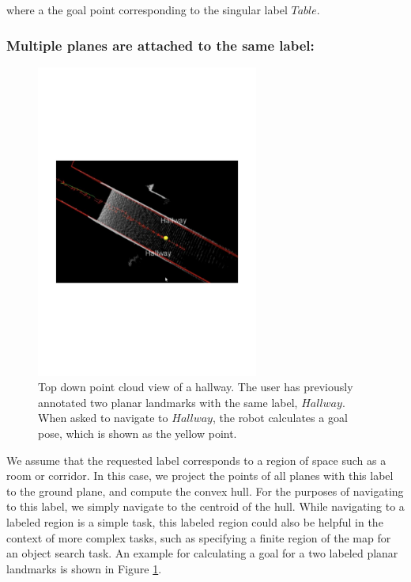 where a the goal point corresponding to the singular label $Table$. 

\subsubsection{Multiple planes are attached to the same label: }

\begin{figure}[ht!]
\centering
\includegraphics[width=0.65\textwidth]{pics/double_plane}
\caption{Top down point cloud view of a hallway. The user has previously annotated two planar landmarks with the same label, $Hallway$. When asked to navigate to $Hallway$, the robot calculates a goal pose, which is shown as the yellow point.}
\label{fig:double_plane}
\end{figure}

We assume that the requested label corresponds to a region of space such as a room or corridor. In this case, we project the points of all planes with this label to the ground plane, and compute the convex hull. For the purposes of navigating to this label, we simply navigate to the centroid of the hull. While navigating to a labeled region is a simple task, this labeled region could also be helpful in the context of more complex tasks, such as specifying a finite region of the map for an object search task. An example for calculating a goal for a two labeled planar landmarks is shown in Figure \ref{fig:double_plane}. 


